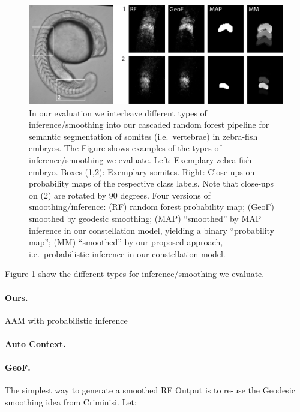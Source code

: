 \documentclass[10pt,twocolumn,letterpaper]{article}
\begin{document}
\begin{figure}[t]
\begin{center}
\includegraphics[width=\columnwidth]{smoothing.jpg} %
\caption{In our evaluation we interleave different types of inference/smoothing into our cascaded random forest pipeline for semantic segmentation of somites (i.e.\ vertebrae) in zebra-fish embryos. 
%
The Figure shows examples of the types of inference/smoothing we evaluate. 
Left: Exemplary zebra-fish embryo. Boxes (1,2): Exemplary somites. Right: Close-ups on probability maps of the respective class labels. Note that close-ups on (2) are rotated by 90 degrees. 
%
Four versions of smoothing/inference: (RF) random forest probability map; (GeoF) smoothed by geodesic smoothing\cite{GeoF2013}; (MAP) "`smoothed"' by MAP inference in our constellation model, yielding a binary "`probability map"'; 
%
(MM) "`smoothed"' by our proposed approach, i.e.\ probabilistic inference in our constellation model.  }
\label{fig:smoothing}
\end{center}
\end{figure}
%
Figure \ref{fig:smoothing} show the different types for inference/smoothing we evaluate. 

\paragraph{Ours. }
AAM with probabilistic inference 

\paragraph{Auto Context. }

\paragraph{GeoF. }
The simplest way to generate a smoothed RF Output is to re-use the Geodesic smoothing idea from Criminisi.  Let:
\end{document}
